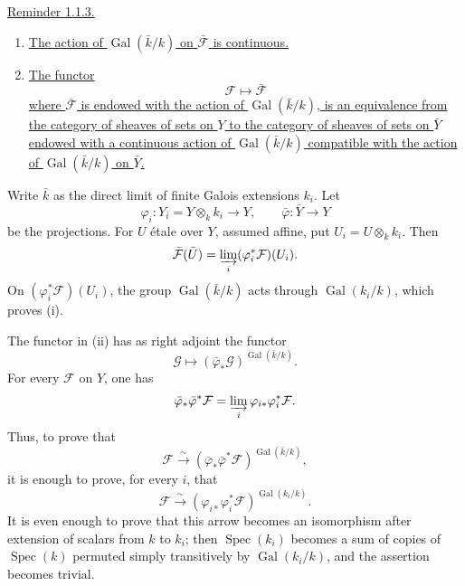 \underline{Reminder 1.1.3.}
\begin{enumerate}[label=(\roman*),leftmargin=2.7em]
\item \underline{The action of $\operatorname{Gal}(\bar k/k)$ on
$\bar{\mathcal F}$ is continuous.}


\item \underline{The functor}
\begin{equation*}
\mathcal F\longmapsto\bar{\mathcal F}
\end{equation*}
\underline{where $\bar{\mathcal F}$ is endowed with the action of
$\operatorname{Gal}(\bar k/k)$, is an equivalence from the category of sheaves of sets on
$Y$ to the category of sheaves of sets on $\bar Y$ endowed with a
continuous action of $\operatorname{Gal}(\bar k/k)$ compatible with the
action of $\operatorname{Gal}(\bar k/k)$ on $\bar Y$.}
\end{enumerate}

Write $\bar k$ as the direct limit of finite Galois extensions $k_i$.
Let
\begin{equation*}
\varphi_i:Y_i=Y\otimes_k k_i\longrightarrow Y,
\qquad
\bar\varphi:\bar Y\longrightarrow Y
\end{equation*}
be the projections.  For $U$ \'{e}tale over $Y$, assumed affine, put
$U_i=U\otimes_k k_i$.  Then
\begin{equation*}
\bar{\mathcal F}(\bar U)
=\varinjlim_i(\varphi_i^*\mathcal F)(U_i).
\end{equation*}
On $(\varphi_i^*\mathcal F)(U_i)$, the group
$\operatorname{Gal}(\bar k/k)$ acts through
$\operatorname{Gal}(k_i/k)$, which proves (i).

The functor in (ii) has as right adjoint the functor
\begin{equation*}
\mathcal G\longmapsto
(\bar\varphi_*\mathcal G)^{\operatorname{Gal}(\bar k/k)}.
\end{equation*}
For every $\mathcal F$ on $Y$, one has
\begin{equation*}
\bar\varphi_*\bar\varphi^*\mathcal F
=\varinjlim_i\varphi_{i*}\varphi_i^*\mathcal F.
\end{equation*}
Thus, to prove that
\begin{equation*}
\mathcal F\xrightarrow{\sim}
(\bar\varphi_*\bar\varphi^*\mathcal F)^{
  \operatorname{Gal}(\bar k/k)},
\end{equation*}
it is enough to prove, for every $i$, that
\begin{equation*}
\mathcal F\xrightarrow{\sim}
(\varphi_{i*}\varphi_i^*\mathcal F)^{
  \operatorname{Gal}(k_i/k)}.
\end{equation*}
It is even enough to prove that this arrow becomes an isomorphism after
extension of scalars from $k$ to $k_i$; then $\operatorname{Spec}(k_i)$
becomes a sum of copies of $\operatorname{Spec}(k)$ permuted simply
transitively by $\operatorname{Gal}(k_i/k)$, and the assertion becomes
trivial.

